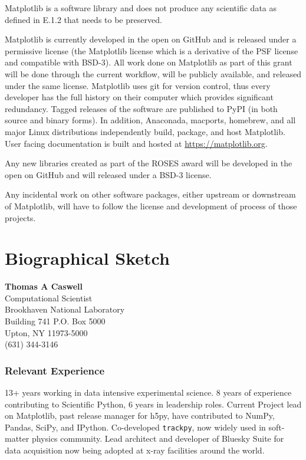 \documentclass[12pt]{article}
\numberwithin{page}{section}
\begin{document}
Matplotlib is a software library and does not produce any scientific
data as defined in E.1.2 that needs to be preserved.

Matplotlib is currently developed in the open on GitHub and is
released under a permissive license (the Matplotlib license which is a
derivative of the PSF license and compatible with BSD-3).  All work
done on Matplotlib as part of this grant will be done through the
current workflow, will be publicly available, and released under the
same license.  Matplotlib uses git for version control, thus every
developer has the full history on their computer which provides
significant redundancy.  Tagged releases of the software are published
to PyPI (in both source and binary forms).  In addition, Anaconada,
macports, homebrew, and all major Linux distributions independently
build, package, and host Matplotlib.  User facing documentation is built
and hosted at \url{https://matplotlib.org}.


Any new libraries created as part of the ROSES award will be developed
in the open on GitHub and will released under a BSD-3 license.

Any incidental work on other software packages, either upstream or
downstream of Matplotlib, will have to follow the license and
development of process of those projects.


\newpage
\section{Biographical Sketch}
\setcounter{page}{1}
\begin{center}
  \textbf{Thomas A Caswell}\\
  Computational Scientist\\
  Brookhaven National Laboratory\\
  Building 741 P.O. Box 5000\\
  Upton, NY 11973-5000\\
  (631) 344-3146\\
\end{center}

\subsubsection*{Relevant Experience}
13+ years working in data intensive experimental science.  8 years of
experience contributing to Scientific Python, 6 years in leadership
roles.  Current Project lead on Matplotlib, past release manager for
h5py, have contributed to NumPy, Pandas, SciPy, and IPython.
Co-developed \texttt{trackpy}, now widely used in soft-matter physics
community.  Lead architect and developer of Bluesky Suite for data
acquisition now being adopted at x-ray facilities around the world.
\end{document}
